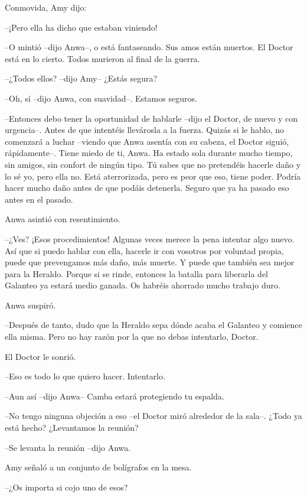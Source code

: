 {Conmovida, Amy dijo:}

{--¡Pero ella ha dicho que estaban viniendo!}

{--O mintió --dijo Anwa--, o está fantaseando. Sus amos están muertos.
El Doctor está en lo cierto. Todos murieron al final de la guerra.}

{--¿Todos ellos? --dijo Amy-- ¿Estás segura?}

{--Oh, sí --dijo Anwa, con suavidad--. Estamos seguros.}

{--Entonces debo tener la oportunidad de hablarle --dijo el Doctor, de
	nuevo y con urgencia--. Antes de que intentéis llevárosla a la fuerza.
	Quizás si le hablo, no comenzará a luchar --viendo que Anwa asentía con
	su cabeza, el Doctor siguió, rápidamente--. Tiene miedo de ti, Anwa. Ha
	estado sola durante mucho tiempo, sin amigos, sin confort de ningún
	tipo. Tú sabes que no pretendéis hacerle daño y lo sé yo, pero ella no.
	Está aterrorizada, pero es peor que eso, tiene poder. Podría hacer mucho
	daño antes de que podáis detenerla. Seguro que ya ha pasado eso antes en
el pasado.}

{Anwa asintió con resentimiento.}

{--¿Ves? ¡Esos procedimientos! Algunas veces merece la pena intentar
	algo nuevo. Así que si puedo hablar con ella, hacerle ir con vosotros
	por voluntad propia, puede que prevengamos más daño, más muerte. Y puede
	que también sea mejor para la Heraldo. Porque si se rinde, entonces la
	batalla para liberarla del Galanteo ya estará medio ganada. Os habréis
ahorrado mucho trabajo duro.}

{Anwa suspiró.}

{--Después de tanto, dudo que la Heraldo sepa dónde acaba el Galanteo
	y comience ella misma. Pero no hay razón por la que no debas intentarlo,
Doctor.}

{El Doctor le sonrió.}

{--Eso es todo lo que quiero hacer. Intentarlo.}

{--Aun así --dijo Anwa-- Camba estará protegiendo tu espalda.}

{--No tengo ninguna objeción a eso --el Doctor miró alrededor de la
sala--. ¿Todo ya está hecho? ¿Levantamos la reunión?}

{--Se levanta la reunión --dijo Anwa.}

{Amy señaló a un conjunto de bolígrafos en la mesa.}

{--¿Os importa si cojo uno de esos?}
